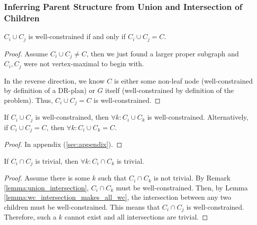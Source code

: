 
\subsubsection{Inferring Parent Structure from Union and Intersection of Children}
\label{sec:infer_parent}


\begin{lemma}\label{lemma:wc_intersection_is_C}
$C_i\cup C_j$ is well-constrained if and only if $C_i\cup C_j = C$.
\end{lemma}

\begin{proof}
Assume $C_i\cup C_j \neq C$, then we just found a larger proper subgraph and $C_i,C_j$ were not vertex-maximal to begin with.

In the reverse direction, we know $C$ is either some non-leaf node (well-constrained by definition of a DR-plan) or $G$ itself (well-constrained by definition of the problem). Thus, $C_i\cup C_j=C$ is well-constrained.
\end{proof}



\begin{lemma}\label{lemma:wc_intersection_makes_all_wc}
If $C_i\cup C_j$ is well-constrained, then $\forall k: C_i\cup C_k$ is well-constrained.
Alternatively, if $C_i\cup C_j=C$, then $\forall k: C_i\cup C_k=C$.
\end{lemma}

\begin{proof}
In appendix (\ref{sec:appendix}).
\end{proof}



\begin{lemma}\label{lemma:uc_intersection_makes_all_uc}
If $C_i\cap C_j$ is trivial, then $\forall k: C_i\cap C_k$ is trivial.
\end{lemma}

\begin{proof}
Assume there is some $k$ such that $C_i\cap C_k$ is not trivial. By Remark \ref{lemma:union_intersection}, $C_i\cap C_k$ must be well-constrained. Then, by Lemma \ref{lemma:wc_intersection_makes_all_wc}, the intersection between any two children must be well-constrained. This means that $C_i\cap C_j$ is well-constrained. Therefore, such a $k$ cannot exist and all intersections are trivial.
\end{proof}


